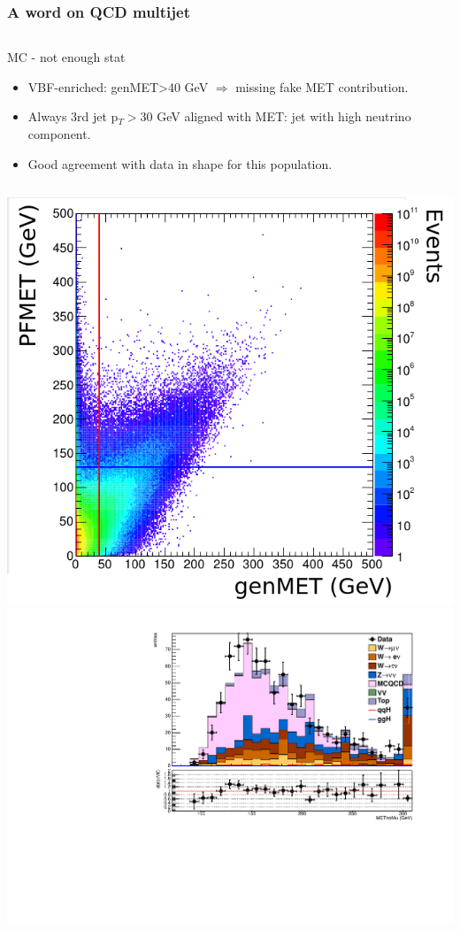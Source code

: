 \documentclass[red,compress,xcolor=table]{beamer}
\begin{document}
\begin{frame}
\frametitle{A word on QCD multijet}


\begin{columns}
\begin{block}{\scriptsize MC - not enough stat}
\begin{itemize}
\item \scriptsize VBF-enriched: genMET>40 GeV $\Rightarrow$ missing fake MET contribution.
\item \scriptsize Always 3rd jet p$_T>30$ GeV aligned with MET: jet with high neutrino component.
\item \scriptsize Good agreement with data in shape for this population.
\end{itemize}
\begin{columns}
\includegraphics[width=1.2\textwidth]{./Joao_140209_p11.png}
\hspace*{-0.5cm}
\includegraphics[width=1.2\textwidth]{./qcdinv_qcd_metnomuons.pdf}\\

\end{columns}
\end{block}
\end{columns}
\end{frame}
\end{document}
